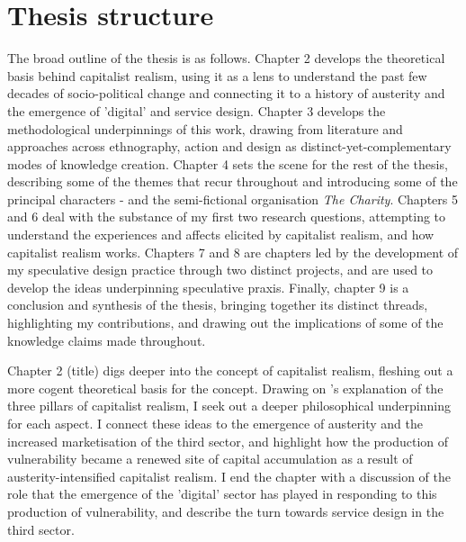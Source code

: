 

\section{Thesis structure}
The broad outline of the thesis is as follows. Chapter 2 develops the theoretical basis behind capitalist realism, using it as a lens to understand the past few decades of socio-political change and connecting it to a history of austerity and the emergence of 'digital' and service design. Chapter 3 develops the methodological underpinnings of this work, drawing from literature and approaches across ethnography, action and design as distinct-yet-complementary modes of knowledge creation.  Chapter 4 sets the scene for the rest of the thesis, describing some of the themes that recur throughout and introducing some of the principal characters - and the semi-fictional organisation \emph{The Charity}. Chapters 5 and 6 deal with the substance of my first two research questions, attempting to understand the experiences and affects elicited by capitalist realism, and how capitalist realism works. Chapters 7 and 8 are chapters led by the development of my speculative design practice through two distinct projects, and are used to develop the ideas underpinning speculative praxis. Finally, chapter 9 is a conclusion and synthesis of the thesis, bringing together its distinct threads, highlighting my contributions, and drawing out the implications of some of the knowledge claims made throughout.

Chapter 2 (title) digs deeper into the concept of capitalist realism, fleshing out a more cogent theoretical basis for the concept. Drawing on \cite{shonkwiler_reading_2014}'s explanation of the three pillars of capitalist realism, I seek out a deeper philosophical underpinning for each aspect. I connect these ideas to the emergence of austerity and the increased marketisation of the third sector, and highlight how the production of vulnerability became a renewed site of capital accumulation as a result of austerity-intensified capitalist realism. I end the chapter with a discussion of the role that the emergence of the 'digital' sector has played in responding to this production of vulnerability, and describe the turn towards service design in the third sector. 

